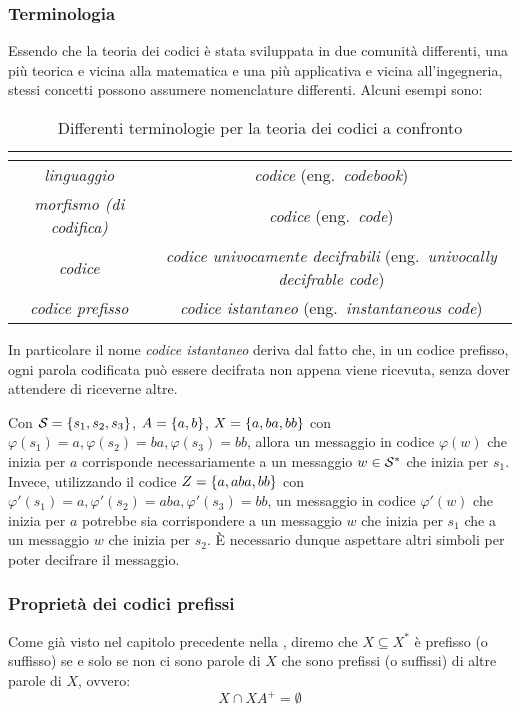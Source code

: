\subsubsection{Terminologia}
Essendo che la teoria dei codici è stata sviluppata in due comunità differenti, una più teorica e vicina alla matematica e una più applicativa e vicina all'ingegneria, stessi concetti possono assumere nomenclature differenti.
Alcuni esempi sono:
\begin{table}[h]
\centering
\begin{tabular}{|c|c|}
\hline
\textbf{\q{Matematica}} & \textbf{\q{Ingegneria}} \\
\hline
\emph{linguaggio} & \emph{codice} (eng.\ \emph{codebook}) \\
\emph{morfismo (di codifica)} & \emph{codice} (eng.\ \emph{code}) \\
\emph{codice} & \emph{codice univocamente decifrabili} (eng.\ \emph{univocally decifrable code}) \\
\emph{codice prefisso} & \emph{codice istantaneo} (eng.\ \emph{instantaneous code}) \\
\hline
\end{tabular}
\caption{Differenti terminologie per la teoria dei codici a confronto}\label{tab:code_theory_terms}
\end{table}

In particolare il nome \emph{codice istantaneo} deriva dal fatto che, in un codice prefisso, ogni parola codificata può essere decifrata non appena viene ricevuta, senza dover attendere di riceverne altre.

\begin{example}{}
  Con \(\SCal = \set{s_1,s_2,s_3}\), \(A = \set{a,b}\), \(X = \set{a,ba,bb}\) con \(\varphi(s_1) = a, \varphi(s_2) = ba, \varphi(s_3) = bb\), allora un messaggio in codice \(\varphi(w)\) che inizia per \(a\) corrisponde necessariamente a un messaggio \(w \in \mathcal{S}^*\) che inizia per \(s_1\).
  Invece, utilizzando il codice \(Z = \set{a,aba,bb}\) con \(\varphi'(s_1) = a, \varphi'(s_2) = aba, \varphi'(s_3) = bb\), un messaggio in codice \(\varphi'(w)\) che inizia per \(a\) potrebbe sia corrispondere a un messaggio \(w\) che inizia per \(s_1\) che a un messaggio \(w\) che inizia per \(s_2\).
  È necessario dunque aspettare altri simboli per poter decifrare il messaggio.
\end{example}

\subsubsection{Proprietà dei codici prefissi}
Come già visto nel capitolo precedente nella , diremo che \(X \subseteq X^*\) è prefisso (o suffisso) se e solo se non ci sono parole di \(X\) che sono prefissi (o suffissi) di altre parole di \(X\), ovvero:
\[X\cap XA^+ = \emptyset\]

